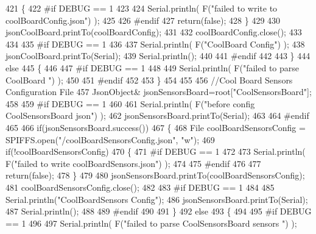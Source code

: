\begin{DoxyCode}
421         \{   
422 \textcolor{preprocessor}{        #if DEBUG == 1}
423             
424             Serial.println( F(\textcolor{stringliteral}{"failed to write to coolBoardConfig.json"}) );
425 
426 \textcolor{preprocessor}{        #endif}
427             \textcolor{keywordflow}{return}(\textcolor{keyword}{false});
428         \}
429         
430         jsonCoolBoard.printTo(coolBoardConfig);
431         
432         coolBoardConfig.close();
433 
434 
435 \textcolor{preprocessor}{    #if DEBUG == 1}
436 
437         Serial.println( F(\textcolor{stringliteral}{"CoolBoard Config"}) );
438         jsonCoolBoard.printTo(Serial);
439         Serial.println();
440     
441 \textcolor{preprocessor}{    #endif}
442         
443     \}
444     \textcolor{keywordflow}{else}
445     \{
446     
447 \textcolor{preprocessor}{    #if DEBUG == 1 }
448 
449         Serial.println( F(\textcolor{stringliteral}{"failed to parse CoolBoard "}) );
450     
451 \textcolor{preprocessor}{    #endif}
452 
453     \}       
454 
455     
456     \textcolor{comment}{//Cool Board Sensors Configuration File}
457         JsonObject& jsonSensorsBoard=root[\textcolor{stringliteral}{"CoolSensorsBoard"}];
458 
459 \textcolor{preprocessor}{#if DEBUG == 1 }
460 
461     Serial.println( F(\textcolor{stringliteral}{"before config CoolSensorsBoard json"}) );
462     jsonSensorsBoard.printTo(Serial);
463 
464 \textcolor{preprocessor}{#endif }
465     
466     \textcolor{keywordflow}{if}(jsonSensorsBoard.success())
467     \{   
468         File coolBoardSensorsConfig = SPIFFS.open(\textcolor{stringliteral}{"/coolBoardSensorsConfig.json"}, \textcolor{stringliteral}{"w"}); 
469         \textcolor{keywordflow}{if}(!coolBoardSensorsConfig)
470         \{
471 \textcolor{preprocessor}{        #if DEBUG == 1 }
472         
473             Serial.println( F(\textcolor{stringliteral}{"failed to write coolBoardSensors.json"}) );
474 
475 \textcolor{preprocessor}{        #endif}
476 
477             \textcolor{keywordflow}{return}(\textcolor{keyword}{false});
478         \}
479         
480         jsonSensorsBoard.printTo(coolBoardSensorsConfig);
481         coolBoardSensorsConfig.close();
482 
483 \textcolor{preprocessor}{    #if DEBUG == 1}
484 
485         Serial.println(\textcolor{stringliteral}{"CoolBoardSensors Config"});
486         jsonSensorsBoard.printTo(Serial);
487         Serial.println();
488 
489 \textcolor{preprocessor}{    #endif}
490 
491     \}
492     \textcolor{keywordflow}{else}
493     \{
494 
495 \textcolor{preprocessor}{    #if DEBUG == 1}
496 
497         Serial.println( F(\textcolor{stringliteral}{"failed to parse CoolSensorsBoard sensors "}) );   

\end{DoxyCode}
